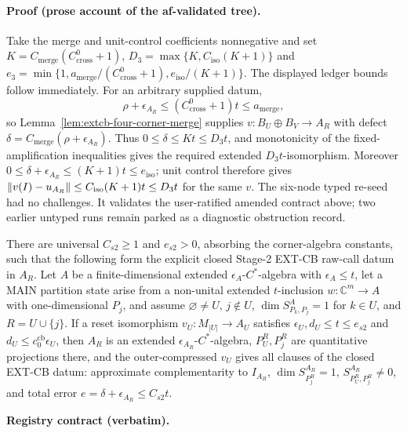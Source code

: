 \paragraph{Proof (prose account of the af-validated tree).}
Take the merge and unit-control coefficients nonnegative and set
$K=C_{\mathrm{merge}}(C^0_{\mathrm{cross}}+1)$,
$D_3=\max\{K,C_{\mathrm{iso}}(K+1)\}$ and
$e_3=\min\{1,a_{\mathrm{merge}}/(C^0_{\mathrm{cross}}+1),e_{\mathrm{iso}}/(K+1)\}$.
The displayed ledger bounds follow immediately.  For an arbitrary supplied datum,
\[
 \rho+\epsilon_{A_R}\le(C^0_{\mathrm{cross}}+1)t\le a_{\mathrm{merge}},
\]
so Lemma~\ref{lem:extcb-four-corner-merge} supplies
$v:B_U\oplus B_V\to A_R$ with defect
$\delta=C_{\mathrm{merge}}(\rho+\epsilon_{A_R})$.  Thus
$0\le\delta\le Kt\le D_3t$, and monotonicity of the fixed-amplification inequalities
gives the required extended $D_3t$-isomorphism.  Moreover
$0\le\delta+\epsilon_{A_R}\le(K+1)t\le e_{\mathrm{iso}}$; unit control therefore gives
$\lVert v(I)-u_{A_R}\rVert\le C_{\mathrm{iso}}(K+1)t\le D_3t$ for the same $v$.
The six-node typed re-seed had no challenges.  It validates the user-ratified amended
contract above; two earlier untyped runs remain parked as a diagnostic obstruction record.
\begin{lemma}\label{lem:maincb-stage2-extcb-datum}
There are universal $C_{s2}\ge1$ and $e_{s2}>0$, absorbing the corner-algebra constants,
such that the following form the explicit closed Stage-2 EXT-CB raw-call datum in $A_R$.
Let $A$ be a finite-dimensional extended $\epsilon_A$-$C^*$-algebra with
$\epsilon_A\le t$, let a MAIN partition state arise from a non-unital extended
$t$-inclusion $w:\mathbb C^m\to A$ with one-dimensional $P_j$, and assume
$\varnothing\ne U$, $j\notin U$, $\dim S^A_{P_k,P_j}=1$ for $k\in U$, and
$R=U\cup\{j\}$.  If a reset isomorphism $v_U:M_{|U|}\to A_U$ satisfies
$\epsilon_U,d_U\le t\le e_{s2}$ and $d_U\le c_0^{\mathrm{cb}}\epsilon_U$, then
$A_R$ is an extended $\epsilon_{A_R}$-$C^*$-algebra,
$P_U^R,P_j^R$ are quantitative projections there, and the outer-compressed $v_U$ gives
all clauses of the closed EXT-CB datum: approximate complementarity to $I_{A_R}$,
$\dim S^{A_R}_{P_j^R}=1$, $S^{A_R}_{P_U^R,P_j^R}\ne0$, and total error
$e=\delta+\epsilon_{A_R}\le C_{s2}t$.
\end{lemma}
\noindent\textbf{Registry contract (verbatim).}
